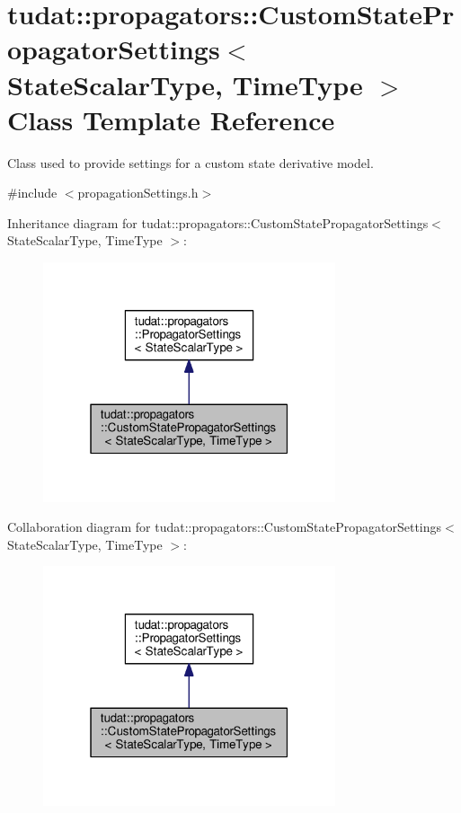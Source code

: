 \hypertarget{classtudat_1_1propagators_1_1CustomStatePropagatorSettings}{}\section{tudat\+:\+:propagators\+:\+:Custom\+State\+Propagator\+Settings$<$ State\+Scalar\+Type, Time\+Type $>$ Class Template Reference}
\label{classtudat_1_1propagators_1_1CustomStatePropagatorSettings}


Class used to provide settings for a custom state derivative model.  




{\ttfamily \#include $<$propagation\+Settings.\+h$>$}



Inheritance diagram for tudat\+:\+:propagators\+:\+:Custom\+State\+Propagator\+Settings$<$ State\+Scalar\+Type, Time\+Type $>$\+:
\nopagebreak
\begin{figure}[H]
\begin{center}
\leavevmode
\includegraphics[width=244pt]{classtudat_1_1propagators_1_1CustomStatePropagatorSettings__inherit__graph}
\end{center}
\end{figure}


Collaboration diagram for tudat\+:\+:propagators\+:\+:Custom\+State\+Propagator\+Settings$<$ State\+Scalar\+Type, Time\+Type $>$\+:
\nopagebreak
\begin{figure}[H]
\begin{center}
\leavevmode
\includegraphics[width=244pt]{classtudat_1_1propagators_1_1CustomStatePropagatorSettings__coll__graph}
\end{center}
\end{figure}
